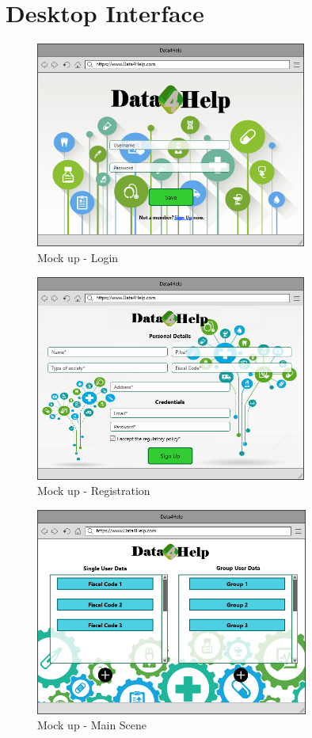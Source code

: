 \section{Desktop Interface}
\begin{figure}[h!]
	\centering
	\includegraphics[width=0.795\textwidth]{./pictures/login.png}\par
	\caption{Mock up - Login}
\end{figure}
\FloatBarrier
\begin{figure}[h!]
	\centering
	\includegraphics[width=0.795\textwidth]{./pictures/registration.png}\par
	\caption{Mock up - Registration}
\end{figure}
\FloatBarrier
\begin{figure}[h!]
	\centering
	\includegraphics[width=0.80\textwidth]{./pictures/main_scene.png}\par
	\caption{Mock up - Main Scene}
\end{figure}
